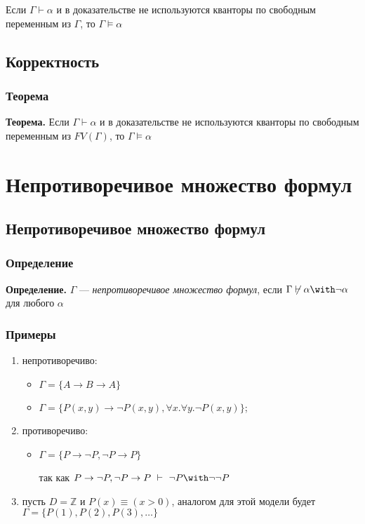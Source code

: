 \documentclass[10pt,a4paper,oneside]{article}
\begin{document}
 Если $\Gamma\vdash\alpha$ и в доказательстве не используются кванторы по свободным
переменным из $\Gamma$, то $\Gamma\models\alpha$

\subsection{Корректность}
\subsubsection{Теорема}

{\bf Теорема.} Если $\Gamma \vdash \alpha$ и в доказательстве не используются кванторы по свободным переменным из $FV(\Gamma)$, то $\Gamma \models \alpha$


\section{Непротиворечивое множество формул}
\subsection{Непротиворечивое множество формул}
\subsubsection{Определение}
{\bf Определение.} $\Gamma$ --- \emph{непротиворечивое множество формул},
если $\Gamma\not\vdash\alpha\with\neg\alpha$ для любого $\alpha$

\subsubsection{Примеры}
\begin{enumerate}
\item непротиворечиво: \begin{itemize}
\item $\Gamma = \{A \rightarrow B \rightarrow A\}$
\item $\Gamma = \{P(x,y)\rightarrow\neg P(x,y), \forall x.\forall y.\neg P(x,y)\}$;
\end{itemize}
\item противоречиво: \begin{itemize}
\item $\Gamma = \{P\rightarrow\neg P, \neg P \rightarrow P\}$

так как
$P\rightarrow\neg P, \neg P \rightarrow P \ \vdash\  \neg P \with \neg\neg P$
\end{itemize}
\item пусть $D = \mathbb{Z}$ и $P(x) \equiv (x > 0)$, аналогом для этой модели
будет $\Gamma = \{P(1), P(2), P(3), \dots\}$
\end{enumerate}
\end{document}
